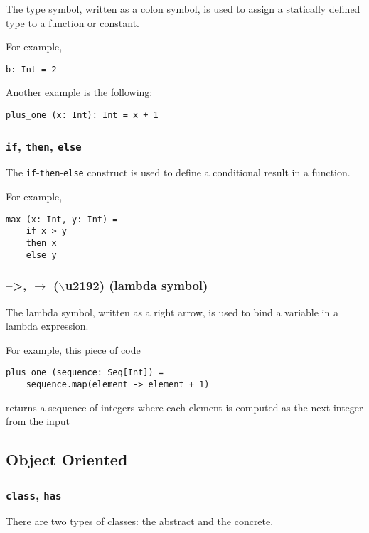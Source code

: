 \documentclass[12pt,a4paper]{article}
\newcommand{\srccode}[1]{\texttt{{#1}}}
\newcommand{\reservedWord}[1]{{\color{blue}\srccode{#1}}\xspace}
\newcommand{\sif}{\reservedWord{if}}
\newcommand{\sthen}{\reservedWord{then}}
\newcommand{\selse}{\reservedWord{else}}
\newcommand{\sclass}{\reservedWord{class}}
\newcommand{\shas}{\reservedWord{has}}
\newcommand{\lambdaSymbol}{{\tiny--\textgreater}}
\begin{document}
    The type symbol, written as a colon symbol, is used to assign a statically defined type to a function or constant.

    For example,
    \begin{lstlisting}[label={lst:exampleType01}]
  b: Int = 2
    \end{lstlisting}

    Another example is the following:
    \begin{lstlisting}[label={lst:exampleType02}]
  plus_one (x: Int): Int = x + 1
    \end{lstlisting}

    \subsubsection{\sif, \sthen, \selse}

    The \sif-\sthen-\selse construct is used to define a conditional result in a function.

    For example,
    \begin{lstlisting}[label={lst:exampleIfThenElse}]
  max (x: Int, y: Int) =
    if x > y
    then x
    else y
    \end{lstlisting}

    \subsubsection{\lambdaSymbol, $\rightarrow$ ($\backslash$u2192) (lambda symbol)}

    The lambda symbol, written as a right arrow, is used to bind a variable in a lambda expression.

    For example, this piece of code
    \begin{lstlisting}[label={lst:exampleLambda}]
  plus_one (sequence: Seq[Int]) =
    sequence.map(element -> element + 1)
    \end{lstlisting}
    returns a sequence of integers where each element is computed as the next integer from the input

    \subsection{Object Oriented}

    \subsubsection{\sclass, \shas}

    There are two types of classes: the abstract and the concrete.
\end{document}
